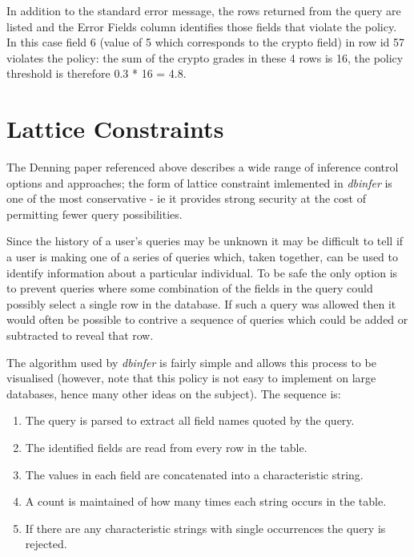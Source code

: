 \documentclass[a4paper,11pt,english]{sphinxmanual}
\begin{document}
In addition to the standard error message, the rows returned from the query are listed and
the Error Fields column identifies those fields that violate the policy. In this case
field 6 (value of 5 which corresponds to the crypto field) in row id 57 violates the policy: the
sum of the crypto grades in these 4 rows is 16, the policy threshold is therefore 0.3 * 16 = 4.8.


\section{Lattice Constraints}
\label{algorithms:lattice-constraints}
The Denning paper referenced above describes a wide range of inference control options and approaches;
the form of lattice constraint imlemented in \emph{dbinfer} is one of the most conservative - ie it provides
strong security at the cost of permitting fewer query possibilities.

Since the history of a user's queries may be unknown it may be difficult to tell if a user is making
one of a series of queries which, taken together, can be used to identify information about a particular
individual. To be safe the only option is to prevent queries where some combination of the fields in the query
could possibly select a single row in the database. If such a query was allowed then it would often be
possible to contrive a sequence of queries which could be added or subtracted to reveal that row.

The algorithm used by \emph{dbinfer} is fairly simple and allows this process to be visualised (however, note that
this policy is not easy to implement on large databases, hence many other ideas on the subject). The sequence is:
\begin{enumerate}
\item {} 
The query is parsed to extract all field names quoted by the query.

\item {} 
The identified fields are read from every row in the table.

\item {} 
The values in each field are concatenated into a characteristic string.

\item {} 
A count is maintained of how many times each string occurs in the table.

\item {} 
If there are any characteristic strings with single occurrences the query is rejected.

\end{enumerate}
\end{document}
